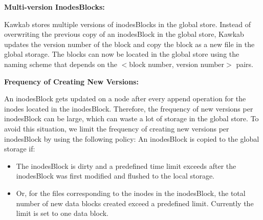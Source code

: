 \documentclass[]{article}
\newcommand{\subtopic}[1]{\vspace{1.5pt} \noindent \textbf{#1}}
\begin{document}


\subtopic{Multi-version InodesBlocks:} 


Kawkab stores multiple versions of inodesBlocks in the global store.  Instead
of overwriting the previous copy of an inodesBlock in the global store, Kawkab
updates the version number of the block and copy the block as a new file in the
global storage. The blocks can now be located in the global store using the naming
scheme that depends on the $<$block number,  version number$>$ pairs.


\subtopic{Frequency of Creating New Versions:}

An inodesBlock gets  updated on a node after every append operation for the
inodes located in the inodesBlock. Therefore, the frequency of new versions
per inodesBlock can be large, which can waste a lot of storage in the global
store.  To avoid this situation, we limit the frequency of creating new
versions per inodesBlock by using the following policy: An inodesBlock is
copied to the global storage if:

\begin{itemize}

\item The inodesBlock is dirty and a predefined time limit exceeds after the
      inodesBlock was first modified and flushed to the local storage.

\item Or, for the files corresponding to the inodes in the inodesBlock, 
      the total number of new data blocks created exceed a predefined limit.
      Currently the limit is set to one data block.

\end{itemize}
\end{document}

